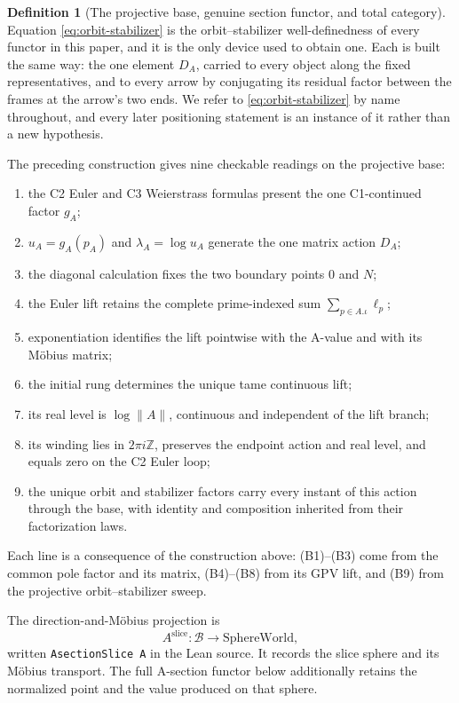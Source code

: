 \documentclass[11pt]{article}
\newcommand{\ZZ}{\mathbb{Z}}
\providecommand{\SphereWorld}{\mathrm{SphereWorld}}
\theoremstyle{plain}
\theoremstyle{definition}
\newtheorem{definition}[theorem]{Definition}
\theoremstyle{remark}
\begin{document}
\begin{definition}[The projective base, genuine section functor, and total category]
Equation \eqref{eq:orbit-stabilizer} is the orbit--stabilizer well-definedness
of every functor in this paper, and it is the only device used to obtain one.
Each is built the same way: the one element $D_A$, carried to every object along
the fixed representatives, and to every arrow by conjugating its residual factor
between the frames at the arrow's two ends.
We refer to \eqref{eq:orbit-stabilizer} by name throughout, and every later
positioning statement is an instance of it rather than a new hypothesis.

The preceding construction gives nine checkable readings on the projective base:
\begin{enumerate}[label=\textup{(B\arabic*)},leftmargin=3.2em,itemsep=2pt]
\item the C2 Euler and C3 Weierstrass formulas present the one C1-continued factor $g_A$;
\item $u_A=g_A(p_A)$ and $\lambda_A=\log u_A$ generate the one matrix action $D_A$;
\item the diagonal calculation fixes the two boundary points $0$ and $N$;
\item the Euler lift retains the complete prime-indexed sum
  $\sum_{p\in A.\iota}\ell_p$;
\item exponentiation identifies the lift pointwise with the A-value and with its M\"obius matrix;
\item the initial rung determines the unique tame continuous lift;
\item its real level is $\log\lVert A\rVert$, continuous and independent of the lift branch;
\item its winding lies in $2\pi i\ZZ$, preserves the endpoint action and real level, and equals
  zero on the C2 Euler loop;
\item the unique orbit and stabilizer factors carry every instant of this action through the base,
  with identity and composition inherited from their factorization laws.
\end{enumerate}
Each line is a consequence of the construction above: \textup{(B1)--(B3)} come from the common
pole factor and its matrix, \textup{(B4)--(B8)} from its GPV lift, and \textup{(B9)} from the
projective orbit--stabilizer sweep.

The direction-and-M\"obius projection is
\[
  A^{\mathrm{slice}}:\mathcal B\longrightarrow\SphereWorld,
\]
written \texttt{AsectionSlice\,A} in the Lean source. It records the slice sphere and its
M\"obius transport. The full A-section functor below additionally retains the normalized point
and the value produced on that sphere.


\end{definition}
\end{document}
